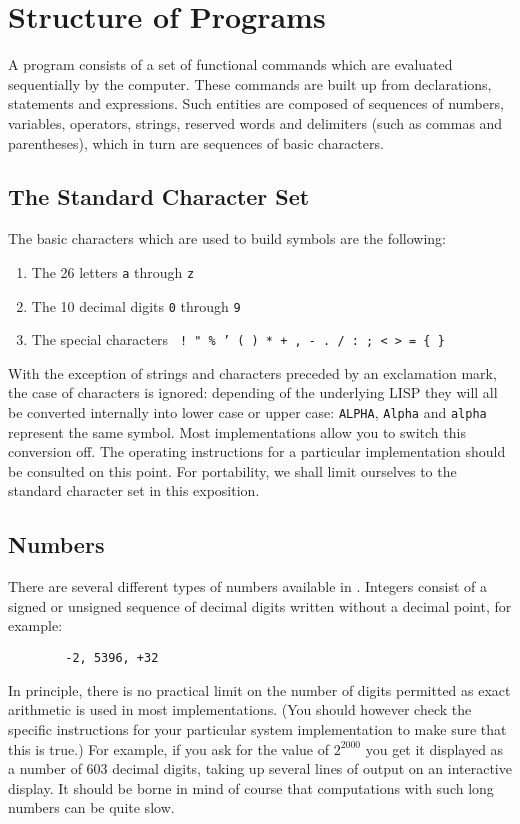 \chapter{Structure of Programs}

A {\REDUCE} program consists of a set of
functional commands which are evaluated sequentially by the computer.
These commands are built up from declarations, statements and expressions.
Such entities are composed of sequences of numbers, variables, operators,
strings, reserved words and delimiters (such as commas and parentheses),
which in turn are sequences of basic characters.

\section{The {\REDUCE} Standard Character Set}

The basic characters which are used to build
{\REDUCE} symbols are the following:
\begin{enumerate}
\item The 26 letters \texttt{a} through \texttt{z}
\item The 10 decimal digits \texttt{0} through \texttt{9}
\item The special characters \texttt{\frenchspacing{}
      \textunderscore{} ! " \textdollar{}
      \% ' ( ) * + , - . / : ; < > = \{ \}} 
\end{enumerate}
With the exception of strings and characters preceded by an
exclamation mark, the case
of characters is ignored: depending of the underlying LISP
they will all be converted internally into lower case or
upper case: \texttt{ALPHA}, \texttt{Alpha} and \texttt{alpha}
represent the same symbol.  Most implementations allow you to switch
this conversion off. The operating instructions for a particular
implementation should be consulted on this point. For portability, we
shall limit ourselves to the standard character set in this exposition.

\section{Numbers}

There are several different types of numbers available in
\REDUCE.  Integers consist of a signed or unsigned sequence of decimal
digits written without a decimal point, for example:
\begin{verbatim}
        -2, 5396, +32
\end{verbatim}
In principle, there is no practical limit on the number of digits
permitted as exact arithmetic is used in most implementations. (You should
however check the specific instructions for your particular system
implementation to make sure that this is true.) For example, if you ask
for the value of $2^{2000}$ you get it
displayed as a number of 603 decimal digits, taking up several lines of
output on an interactive display.  It should be borne in mind of course
that computations with such long numbers can be quite slow.

